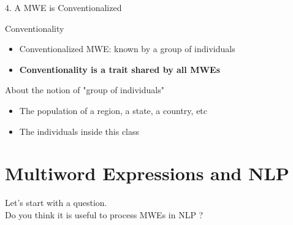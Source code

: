 \documentclass[serif, aspectratio=169]{beamer}
\begin{document}
\begin{frame}{4. A MWE is Conventionalized}
    \begin{block}{Conventionality}
        \begin{itemize}
            \item Conventionalized MWE: known by a group of individuals
            \item \textbf{Conventionality is a trait shared by all MWEs}
        \end{itemize}
    \end{block}
    \vfill
    \pause
    \begin{block}{About the notion of "group of individuals"}
        \begin{itemize}
            \item The population of a region, a state, a country, etc
            \item The individuals inside this class
        \end{itemize}
    \end{block}
\end{frame}

\section{Multiword Expressions and NLP}

\begin{exoframe}{}
    \begin{center}
        \Large
        Let's start with a question. \\
        \vspace{10pt}
        Do you think it is useful to process MWEs in NLP ?
    \end{center}
\end{exoframe}
\end{document}
